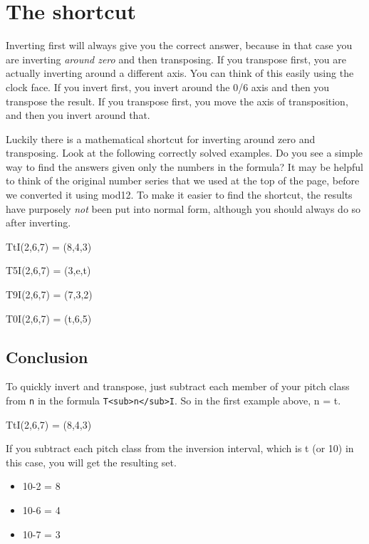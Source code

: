 \documentclass{book}
\providecommand{\tightlist}{%
  \setlength{\itemsep}{0pt}\setlength{\parskip}{0pt}}
\begin{document}
\hypertarget{the-shortcut}{%
\section{The shortcut}\label{the-shortcut}}

Inverting first will always give you the correct answer, because in that case
you are inverting \emph{around zero} and then transposing. If you transpose
first, you are actually inverting around a different axis. You can think of
this easily using the clock face. If you invert first, you invert around the
0/6 axis and then you transpose the result. If you transpose first, you move
the axis of transposition, and then you invert around that.

Luckily there is a mathematical shortcut for inverting around zero and
transposing. Look at the following correctly solved examples. Do you see a
simple way to find the answers given only the numbers in the formula? It may
be helpful to think of the original number series that we used at the top of
the page, before we converted it using mod12. To make it easier to find the
shortcut, the results have purposely \emph{not} been put into normal form,
although you should always do so after inverting.

TtI(2,6,7) = (8,4,3)

T5I(2,6,7) = (3,e,t)

T9I(2,6,7) = (7,3,2)

T0I(2,6,7) = (t,6,5)

\hypertarget{conclusion-9}{%
\subsection{Conclusion}\label{conclusion-9}}

To quickly invert and transpose, just subtract each member of your pitch class
from \texttt{n} in the formula
\texttt{T\textless{}sub\textgreater{}n\textless{}/sub\textgreater{}I}. So in
the first example above, n = t.

TtI(2,6,7) = (8,4,3)

If you subtract each pitch class from the inversion interval, which is t (or
10) in this case, you will get the resulting set.

\begin{itemize}
\tightlist
\item
  10-2 = 8
\item
  10-6 = 4
\item
  10-7 = 3
\end{itemize}
\end{document}

